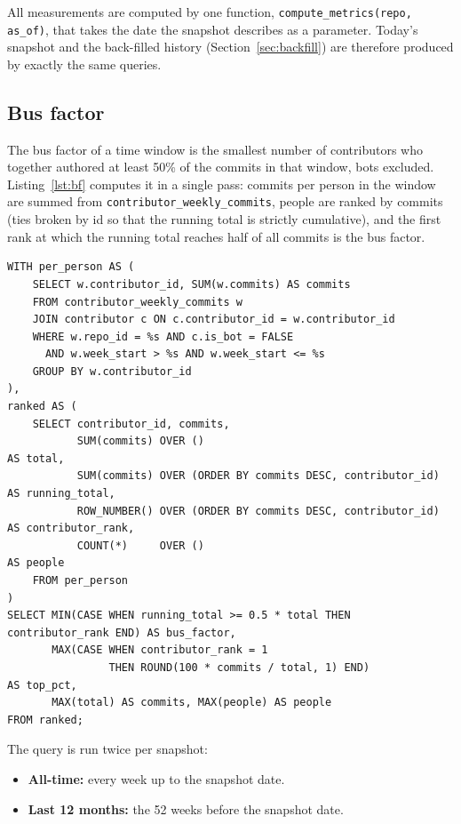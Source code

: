 \documentclass[11pt,a4paper]{report}
\begin{document}
All measurements are computed by one function, \texttt{compute\_metrics(repo,
as\_of)}, that takes the date the snapshot describes as a parameter. Today's
snapshot and the back-filled history (Section~\ref{sec:backfill}) are therefore
produced by exactly the same queries.

\subsection{Bus factor}

The bus factor of a time window is the smallest number of contributors who
together authored at least 50\% of the commits in that window, bots excluded.
Listing~\ref{lst:bf} computes it in a single pass: commits per person in the
window are summed from \texttt{contributor\_weekly\_commits}, people are ranked
by commits (ties broken by id so that the running total is strictly
cumulative), and the first rank at which the running total reaches half of
all commits is the bus factor.

\begin{lstlisting}[language=MySQL, caption={Bus factor over a window of weeks (after, until], bots excluded.}, label={lst:bf}]
WITH per_person AS (
    SELECT w.contributor_id, SUM(w.commits) AS commits
    FROM contributor_weekly_commits w
    JOIN contributor c ON c.contributor_id = w.contributor_id
    WHERE w.repo_id = %s AND c.is_bot = FALSE
      AND w.week_start > %s AND w.week_start <= %s
    GROUP BY w.contributor_id
),
ranked AS (
    SELECT contributor_id, commits,
           SUM(commits) OVER ()                                      AS total,
           SUM(commits) OVER (ORDER BY commits DESC, contributor_id) AS running_total,
           ROW_NUMBER() OVER (ORDER BY commits DESC, contributor_id) AS contributor_rank,
           COUNT(*)     OVER ()                                      AS people
    FROM per_person
)
SELECT MIN(CASE WHEN running_total >= 0.5 * total THEN contributor_rank END) AS bus_factor,
       MAX(CASE WHEN contributor_rank = 1
                THEN ROUND(100 * commits / total, 1) END)                   AS top_pct,
       MAX(total) AS commits, MAX(people) AS people
FROM ranked;
\end{lstlisting}

The query is run twice per snapshot:

\begin{itemize}
  \item \textbf{All-time:} every week up to the snapshot date.
  \item \textbf{Last 12 months:} the 52 weeks before the snapshot date.
\end{itemize}
\end{document}
